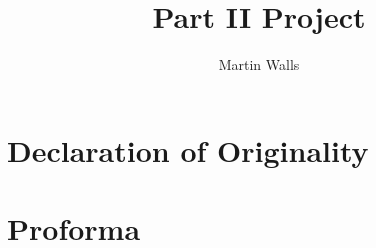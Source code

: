 \documentclass[12pt, a4paper]{article}
\title{Part II Project}
\author{Martin Walls}
\begin{document}
\maketitle

\renewcommand{\thesection}{\roman{section}}

\section{Declaration of Originality}

\section{Proforma}

\tableofcontents

\renewcommand{\thesection}{\arabic{section}}
\setcounter{section}{0}











\printbibliography

\printindex
\end{document}
